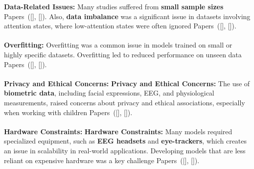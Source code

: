 \documentclass[12pt]{article}
\begin{document}
\textbullet \textbf{Data-Related Issues:} Many studies suffered from \textbf{small sample sizes} Papers~([\citealp{ref3}], [\citealp{ref13}]). Also, \textbf{data imbalance} was a significant issue in datasets involving attention states, where low-attention states were often ignored Papers~([\citealp{ref9}], [\citealp{ref19}]). \\ \\ 
\textbullet \textbf{Overfitting:} Overfitting was a common issue in models trained on small or highly specific datasets. Overfitting led to reduced performance on unseen data Papers~([\citealp{ref6}], [\citealp{ref15}]).  \\ \\
\textbullet \textbf{Privacy and Ethical Concerns:} \textbf{Privacy and Ethical Concerns:} The use of \textbf{biometric data}, including facial expressions, EEG, and physiological measurements, raised concerns about privacy and ethical associations, especially when working with children Papers~([\citealp{ref6}], [\citealp{ref15}]).  \\ \\
\textbullet \textbf{Hardware Constraints:} \textbf{Hardware Constraints:} Many models required specialized equipment, such as \textbf{EEG headsets} and \textbf{eye-trackers}, which creates an issue in scalability in real-world applications. Developing models that are less reliant on expensive hardware was a key challenge Papers~([\citealp{ref8}], [\citealp{ref14}]). \\ 
\end{document}
